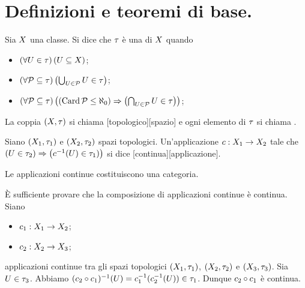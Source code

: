 \section{Definizioni e teoremi di base.}\label{DefinizioniETeoremiDiBase}
\begin{Definition}
	Sia $X$ una classe. Si dice che $\tau$ \`e
	una  di $X$ quando
	\begin{itemize}
		\item $\left ( \forall U \in \tau \right ) \left ( U \subseteq
		X \right )$;
		\item $\left ( \forall \mathcal{P} \subseteq \tau \right ) \left ( \bigcup_{U
		\in \mathcal{P}} U \in \tau \right )$;
		\item $\left ( \forall \mathcal{P} \subseteq \tau \right ) \left ( \left ( \operatorname{Card}{\mathcal{P}}
		\leq \aleph_0 \right ) \Rightarrow \left ( {\bigcap_{U \in \mathcal{P}} U \in
		\tau} \right ) \right )$;
	\end{itemize}
	La coppia $(X,\tau)$ si chiama
	[topologico][spazio] e ogni elemento di
	$\tau$ si chiama .
\end{Definition}
\begin{Definition}
	Siano $(X_1,\tau_1)$ e
	 $(X_2, \tau_2)$ spazi topologici.
	 Un'applicazione
	 $c:  X_1 \rightarrow
	 X_2$ tale che
	$\left ( U \in \tau_2 \right ) \Rightarrow \left ( c^{-1}(U) \in
	 \tau_1) \right )$ si dice [continua][applicazione].
\end{Definition}
\begin{Theorem}
	Le applicazioni continue costituiscono una categoria.
\end{Theorem}
\Proof \`E sufficiente provare che la composizione di applicazioni
 continue \`e continua. Siano
\begin{itemize}
	\item $c_1: X_1 \rightarrow
	X_2$;
	\item $c_2: X_2 \rightarrow
	X_3$;
\end{itemize}
applicazioni continue tra gli spazi topologici
$(X_1,\tau_1)$,
$(X_2,\tau_2)$ e
$(X_3,\tau_3)$.
Sia $U \in \tau_3$. Abbiamo
$(c_2 \circ c_1)^{-1}(U) =
c_1^{-1}(c_2^{-1}(U)) \in \tau_1$.
Dunque $c_2 \circ c_1$ \`e continua. \EndProof
